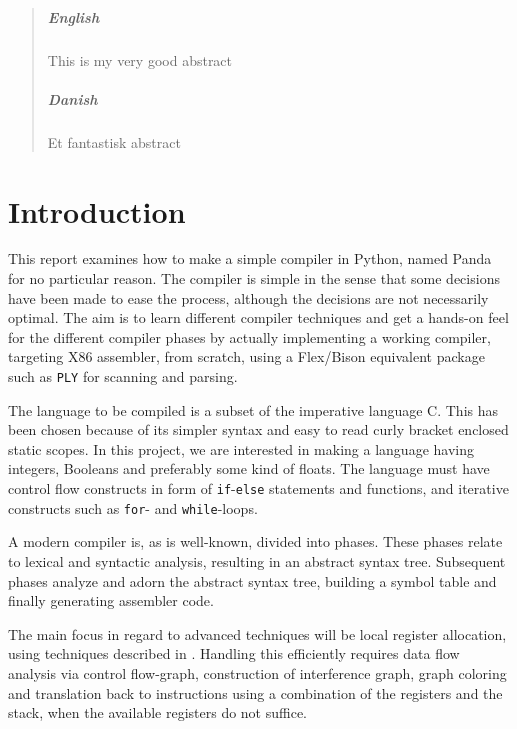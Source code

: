 
\begin{abstract}
    \paragraph{English}
    This is my very good abstract

    \paragraph{Danish}
    Et fantastisk abstract
\end{abstract}

{ \hypersetup{hidelinks} \tableofcontents }

\newpage
{}
\setcounter{page}{1}

\chapter{Introduction}
This report examines how to make a simple compiler in Python, named Panda for no particular reason. The compiler is simple in the sense that some decisions have been made to ease the process, although the decisions are not necessarily optimal. The aim is to learn different compiler techniques and get a hands-on feel for the different compiler phases by actually implementing a working compiler, targeting X86 assembler, from scratch, using a Flex/Bison equivalent package such as \texttt{PLY} for scanning and parsing. 

The language to be compiled is a subset of the imperative language C. This has been chosen because of its simpler syntax and easy to read curly bracket enclosed static scopes. In this project, we are interested in making a language having integers, Booleans and preferably some kind of floats. The language must have control flow constructs in form of \texttt{if}-\texttt{else} statements and functions, and iterative constructs such as \texttt{for}- and \texttt{while}-loops. 

A modern compiler is, as is well-known, divided into phases. These phases relate to lexical and syntactic analysis, resulting in an abstract syntax tree. Subsequent phases analyze and adorn the abstract syntax tree, building a symbol table and finally generating assembler code.

The main focus in regard to advanced techniques will be local register allocation, using techniques described in \cite{EnginneringACompiler}. Handling this efficiently requires data flow analysis via control flow-graph, construction of interference graph, graph coloring and translation back to instructions using a combination of the registers and the stack, when the available registers do not suffice.

